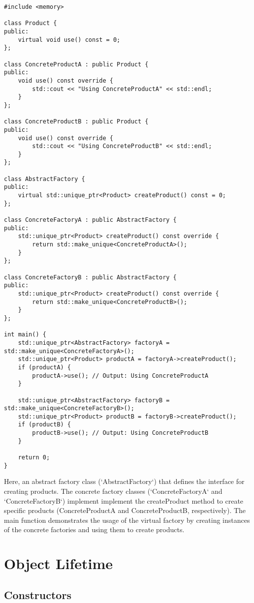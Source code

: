 \documentclass[openany]{report}
\begin{document}
\begin{verbatim}
#include <memory>

class Product {
public:
    virtual void use() const = 0;
};

class ConcreteProductA : public Product {
public:
    void use() const override {
        std::cout << "Using ConcreteProductA" << std::endl;
    }
};

class ConcreteProductB : public Product {
public:
    void use() const override {
        std::cout << "Using ConcreteProductB" << std::endl;
    }
};

class AbstractFactory {
public:
    virtual std::unique_ptr<Product> createProduct() const = 0;
};

class ConcreteFactoryA : public AbstractFactory {
public:
    std::unique_ptr<Product> createProduct() const override {
        return std::make_unique<ConcreteProductA>();
    }
};

class ConcreteFactoryB : public AbstractFactory {
public:
    std::unique_ptr<Product> createProduct() const override {
        return std::make_unique<ConcreteProductB>();
    }
};

int main() {
    std::unique_ptr<AbstractFactory> factoryA = std::make_unique<ConcreteFactoryA>();
    std::unique_ptr<Product> productA = factoryA->createProduct();
    if (productA) {
        productA->use(); // Output: Using ConcreteProductA
    }
    
    std::unique_ptr<AbstractFactory> factoryB = std::make_unique<ConcreteFactoryB>();
    std::unique_ptr<Product> productB = factoryB->createProduct();
    if (productB) {
        productB->use(); // Output: Using ConcreteProductB
    }
    
    return 0;
}
\end{verbatim}

Here, an abstract factory class (`AbstractFactory`) that defines the interface for creating products.
The concrete factory classes (`ConcreteFactoryA` and `ConcreteFactoryB`) implement
implement the createProduct method to create specific products (ConcreteProductA and ConcreteProductB, respectively).
The main function demonstrates the usage of 
the virtual factory by creating instances of the concrete factories and using them to create products.

\chapter{Object Lifetime}

\section{Constructors}
\end{document}
